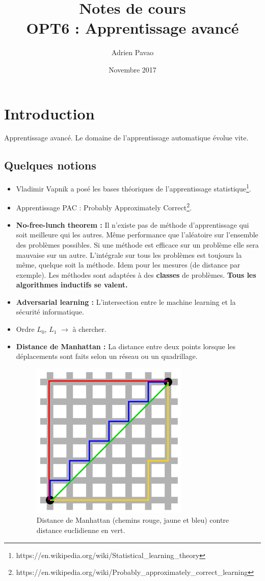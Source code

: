 \documentclass{article}
\title{Notes de cours\\OPT6 : Apprentissage avancé}
\author{Adrien Pavao}
\date{Novembre 2017}
\begin{document}
\maketitle


\section{Introduction}

Apprentissage avancé. Le domaine de l'apprentissage automatique évolue vite.

\subsection{Quelques notions}
\begin{itemize}
\item Vladimir Vapnik a posé les bases théoriques de l'apprentissage statistique\footnote{https://en.wikipedia.org/wiki/Statistical\_learning\_theory}.
\item Apprentissage PAC : Probably Approximately Correct\footnote{https://en.wikipedia.org/wiki/Probably\_approximately\_correct\_learning}.
\item \textbf{No-free-lunch theorem :} Il n'existe pas de méthode d'apprentissage qui soit meilleure qui les autres. Même performance que l'aléatoire sur l'ensemble des problèmes possibles. Si une méthode est efficace sur un problème elle sera mauvaise sur un autre. L'intégrale sur tous les problèmes est toujours la même, quelque soit la méthode. Idem pour les mesures (de distance par exemple). Les méthodes sont adaptées à des \textbf{classes} de problèmes. \textbf{Tous les algorithmes inductifs se valent.}
\item \textbf{Adversarial learning :} L'intersection entre le machine learning et la sécurité informatique.
\item Ordre $L_0$, $L_1$ $\rightarrow$ à chercher. 
\item \textbf{Distance de Manhattan :} La distance entre deux points lorsque les déplacements sont faits selon un réseau ou un quadrillage. 

\begin{figure}[H]
    \begin{center} \includegraphics[scale=0.5]{manhattan.png} \end{center}
     \caption{Distance de Manhattan (chemins rouge, jaune et bleu) contre distance euclidienne en vert.}
\end{figure}


\end{itemize}
\end{document}
